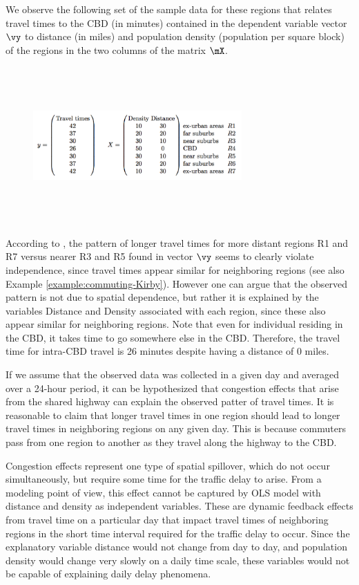 \documentclass[english,12pt]{book}\usepackage[]{graphicx}\usepackage[]{xcolor}
\begin{document}
We observe the following set of the sample data for these regions that relates travel times to the CBD (in minutes) contained in the dependent variable vector $\vy$ to distance (in miles) and population density (population per square block) of the regions in the two columns of the matrix $\mX$.

\begin{figure}[H]
		    \centering 
		      \includegraphics[width = 8cm, height=6cm]{figure/lesage2.png}
\end{figure}	

According to \cite{lesage2010introduction}, the pattern of longer travel times for more distant regions R1 and R7 versus nearer R3 and R5 found in vector $\vy$ seems to clearly violate independence, since travel times appear similar for neighboring regions (see also Example \ref{example:commuting-Kirby}). However one can argue that the observed pattern is not due to spatial dependence, but rather it is explained by the variables Distance and Density associated with each region, since these also appear similar for neighboring regions. Note that even for individual residing in the CBD, it takes time to go somewhere else in the CBD. Therefore, the travel time for intra-CBD travel is 26 minutes despite having a distance of 0 miles. 

If we assume that the observed data was collected in a given day and averaged over a 24-hour period, it can be hypothesized that congestion effects that arise from the shared highway can explain the observed patter of travel times.  It is reasonable to claim that longer travel times in one region should lead to longer travel times in neighboring regions on any given day. This is because commuters pass from one region to another as they travel along the highway to the CBD.

Congestion effects represent one type of spatial spillover, which do not occur simultaneously, but require some time for the traffic delay to arise. From a modeling point of view, this effect cannot be captured by OLS model with distance and density as independent variables. These are dynamic feedback effects from travel time on a particular day that impact travel times of neighboring regions in the short time interval required for the traffic delay to occur. Since the explanatory variable distance would not change from day to day, and population density would change very slowly on a daily time scale, these variables would not be capable of explaining daily delay phenomena. 
\end{document}
